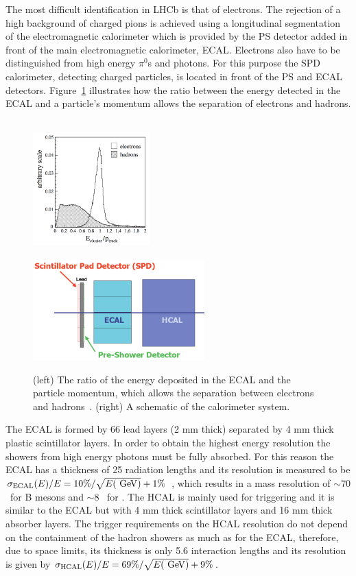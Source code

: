 The most difficult identification in LHCb is that of electrons. The rejection of a high background of charged pions
is achieved using a longitudinal segmentation of the electromagnetic calorimeter which is provided by
the PS detector added in front of the main electromagnetic calorimeter, ECAL. Electrons also have to be 
distinguished from high energy $\pi^0$s and photons. For this purpose the SPD calorimeter, detecting charged particles,
is located in front of the PS and ECAL detectors. Figure~\ref{fig:pi0_e_pid_perf} illustrates how the ratio between the
energy detected in the ECAL and a particle's momentum allows the separation of electrons and hadrons.

\begin{figure}[t!]
\centering
\includegraphics[width=0.4\textwidth,height=5.3cm]{Detector/figs/pi0_e_pid_perf.png}
\includegraphics[width=0.59\textwidth]{Detector/figs/calo_layout.png}
\caption{(left) The ratio of the energy deposited in the ECAL and the particle momentum, which allows
the separation between electrons and hadrons~\cite{Alves:2008zz}. (right) A schematic of the calorimeter system. }
\label{fig:pi0_e_pid_perf}
\end{figure}

The ECAL is formed by 66 lead layers (2 mm thick) separated by 4 mm thick plastic scintillator layers.
In order to obtain the highest energy resolution the showers from high energy photons 
must be fully absorbed. For this reason the ECAL has a thickness of 25 radiation lengths and its resolution is 
measured to be $\sigma_{\rm ECAL}(E) / E = 10\% / \sqrt{E(\gev )} + 1\%$~\cite{Alves:2008zz},
which results in a mass resolution of $\sim 70$ \mevcc~for B mesons and $\sim 8$ \mevcc~for \piz.
The HCAL is mainly used for triggering and it is similar to the ECAL but with 4 mm thick scintillator layers and 
16 mm thick absorber layers. The trigger requirements on the HCAL resolution do not depend on the containment of the hadron showers
as much as for the ECAL, therefore, due to space limits, its thickness is only 5.6 interaction lengths and its resolution is given by
 $\sigma_{\rm HCAL}(E) / E = 69\%/\sqrt{E(\gev )} + 9\%$.

